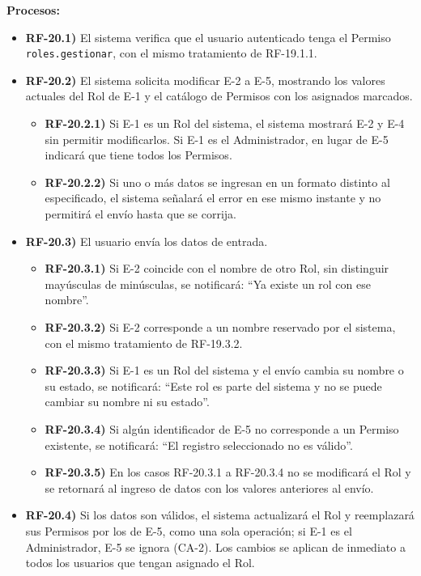 \textbf{Procesos:}
\begin{itemize}[label={}, leftmargin=1.5em]
  \item \textbf{RF-20.1)} El sistema verifica que el usuario autenticado tenga el Permiso \texttt{roles.gestionar}, con el mismo tratamiento de RF-19.1.1.
  \item \textbf{RF-20.2)} El sistema solicita modificar E-2 a E-5, mostrando los valores actuales del Rol de E-1 y el cat\'alogo de Permisos con los asignados marcados.
  \begin{itemize}[label={}, leftmargin=1.5em]
    \item \textbf{RF-20.2.1)} Si E-1 es un Rol del sistema, el sistema mostrar\'a E-2 y E-4 sin permitir modificarlos. Si E-1 es el Administrador, en lugar de E-5 indicar\'a que tiene todos los Permisos.
    \item \textbf{RF-20.2.2)} Si uno o m\'as datos se ingresan en un formato distinto al especificado, el sistema se\~nalar\'a el error en ese mismo instante y no permitir\'a el env\'io hasta que se corrija.
  \end{itemize}
  \item \textbf{RF-20.3)} El usuario env\'ia los datos de entrada.
  \begin{itemize}[label={}, leftmargin=1.5em]
    \item \textbf{RF-20.3.1)} Si E-2 coincide con el nombre de otro Rol, sin distinguir may\'usculas de min\'usculas, se notificar\'a: ``Ya existe un rol con ese nombre''.
    \item \textbf{RF-20.3.2)} Si E-2 corresponde a un nombre reservado por el sistema, con el mismo tratamiento de RF-19.3.2.
    \item \textbf{RF-20.3.3)} Si E-1 es un Rol del sistema y el env\'io cambia su nombre o su estado, se notificar\'a: ``Este rol es parte del sistema y no se puede cambiar su nombre ni su estado''.
    \item \textbf{RF-20.3.4)} Si alg\'un identificador de E-5 no corresponde a un Permiso existente, se notificar\'a: ``El registro seleccionado no es v\'alido''.
    \item \textbf{RF-20.3.5)} En los casos RF-20.3.1 a RF-20.3.4 no se modificar\'a el Rol y se retornar\'a al ingreso de datos con los valores anteriores al env\'io.
  \end{itemize}
  \item \textbf{RF-20.4)} Si los datos son v\'alidos, el sistema actualizar\'a el Rol y reemplazar\'a sus Permisos por los de E-5, como una sola operaci\'on; si E-1 es el Administrador, E-5 se ignora (CA-2). Los cambios se aplican de inmediato a todos los usuarios que tengan asignado el Rol.

\end{itemize}
